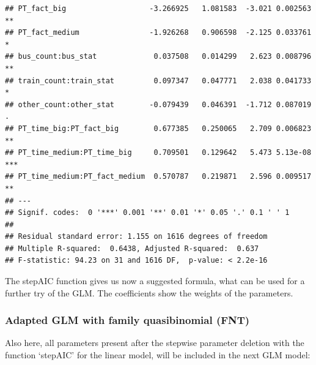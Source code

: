 \documentclass[
]{article}
\begin{document}
\begin{verbatim}
## PT_fact_big                   -3.266925   1.081583  -3.021 0.002563 ** 
## PT_fact_medium                -1.926268   0.906598  -2.125 0.033761 *  
## bus_count:bus_stat             0.037508   0.014299   2.623 0.008796 ** 
## train_count:train_stat         0.097347   0.047771   2.038 0.041733 *  
## other_count:other_stat        -0.079439   0.046391  -1.712 0.087019 .  
## PT_time_big:PT_fact_big        0.677385   0.250065   2.709 0.006823 ** 
## PT_time_medium:PT_time_big     0.709501   0.129642   5.473 5.13e-08 ***
## PT_time_medium:PT_fact_medium  0.570787   0.219871   2.596 0.009517 ** 
## ---
## Signif. codes:  0 '***' 0.001 '**' 0.01 '*' 0.05 '.' 0.1 ' ' 1
## 
## Residual standard error: 1.155 on 1616 degrees of freedom
## Multiple R-squared:  0.6438, Adjusted R-squared:  0.637 
## F-statistic: 94.23 on 31 and 1616 DF,  p-value: < 2.2e-16
\end{verbatim}

The stepAIC function gives us now a suggested formula, what can be used
for a further try of the GLM. The coefficients show the weights of the
parameters.

\hypertarget{adapted-glm-with-family-quasibinomial-fnt}{%
\subsubsection{Adapted GLM with family quasibinomial
(FNT)}\label{adapted-glm-with-family-quasibinomial-fnt}}

Also here, all parameters present after the stepwise parameter deletion
with the function `stepAIC' for the linear model, will be included in
the next GLM model:
\end{document}
